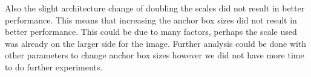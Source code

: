 \documentclass[10pt,twocolumn,letterpaper]{article}
\begin{document}
Also the slight architecture change of doubling the scales did not result in better performance. This means that increasing the anchor box sizes did not result in better performance. This could be due to many factors, perhaps the scale used was already on the larger side for the image. Further analysis could be done with other parameters to change anchor box sizes however we did not have more time to do further experiments. 







\end{document}
